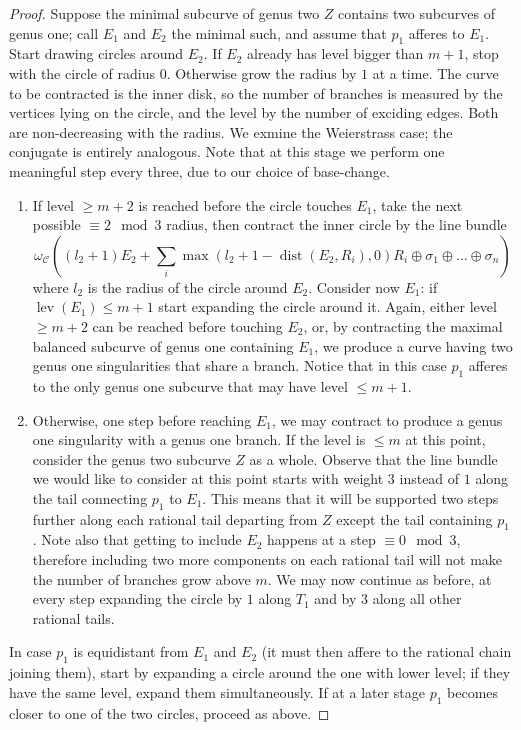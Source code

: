 \documentclass[11pt]{amsart}
\newcommand{\lev}{\operatorname{lev}}
\theoremstyle{plain}
\theoremstyle{definition}
\begin{document}
\begin{proof}
 Suppose the minimal subcurve of genus two $Z$ contains two subcurves of genus one; call $E_1$ and $E_2$ the minimal such, and assume that $p_1$ afferes to $E_1$. Start drawing circles around $E_2$. If $E_2$ already has level bigger than $m+1$, stop with the circle of radius $0$. Otherwise grow the radius by $1$ at a time. The curve to be contracted is the inner disk, so the number of branches is measured by the vertices lying on the circle, and the level by the number of exciding edges. Both are non-decreasing with the radius. We exmine the Weierstrass case; the conjugate is entirely analogous. Note that at this stage we perform one meaningful step every three, due to our choice of base-change.
  \begin{enumerate}
   \item If level $\geq m+2$ is reached before the circle touches $E_1$, take the next possible $\equiv 2\mod 3$ radius, then contract the inner circle by the line bundle
   \[ \omega_{\mathcal C}((l_2+1)E_2+\sum_i \max(l_2+1-\operatorname{dist}(E_2,R_i),0)R_i\oplus\sigma_1\oplus\ldots\oplus\sigma_n)\]
   where $l_2$ is the radius of the circle around $E_2$. Consider now $E_1$: if $\lev(E_1)\leq m+1$ start expanding the circle around it. Again, either level $\geq m+2$ can be reached before touching $E_2$, or, by contracting the maximal balanced subcurve of genus one containing $E_1$, we produce a curve having two genus one singularities that share a branch. Notice that in this case $p_1$ afferes to the only genus one subcurve that may have level $\leq m+1$.
   \item Otherwise, one step before reaching $E_1$, we may contract to produce a genus one singularity with a genus one branch. If the level is $\leq m$ at this point, consider the genus two subcurve $Z$ as a whole. Observe that the line bundle we would like to consider at this point starts with weight $3$ instead of $1$ along the tail connecting $p_1$ to $E_1$. This means that it will be supported two steps further along each rational tail departing from $Z$ except the tail containing $p_1$. Note also that getting to include $E_2$ happens at a step $\equiv 0 \mod 3$, therefore including two more components on each rational tail will not make the number of branches grow above $m$. We may now continue as before, at every step expanding the circle by $1$ along $T_1$ and by $3$ along all other rational tails.
  \end{enumerate}
 In case $p_1$ is equidistant from $E_1$ and $E_2$ (it must then affere to the rational chain joining them), start by expanding a circle around the one with lower level; if they have the same level, expand them simultaneously. If at a later stage $p_1$ becomes closer to one of the two circles, proceed as above.
 

\end{proof}
\end{document}
